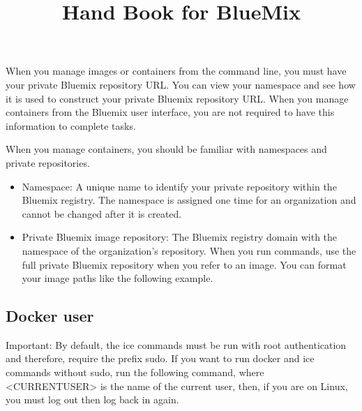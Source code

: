 \documentclass[]{article}
\title{Hand Book for BlueMix }
\author{}
\begin{document}
\maketitle

\begin{abstract}

\end{abstract}

\section{}

When you manage images or containers from the command line, you must have your private Bluemix repository URL. You can view your namespace and see how it is used to construct your private Bluemix repository URL. When you manage containers from the Bluemix user interface, you are not required to have this information to complete tasks.

When you manage containers, you should be familiar with namespaces and private repositories.
\begin{itemize}

\item Namespace: A unique name to identify your private repository within the Bluemix registry. The namespace is assigned one time for an organization and cannot be changed after it is created.
\item Private Bluemix image repository: The Bluemix registry domain with the namespace of the organization's repository. When you run commands, use the full private Bluemix repository when you refer to an image. You can format your image paths like the following example.
\end{itemize}


\subsection{Docker user}
Important: By default, the ice commands must be run with root authentication and therefore, require the prefix sudo. If you want to run docker and ice commands without sudo, run the following command, where <CURRENTUSER> is the name of the current user, then, if you are on Linux, you must log out then log back in again.




\end{document}
